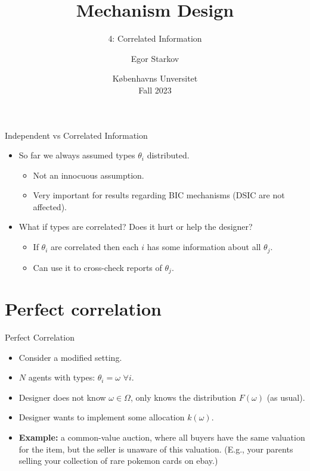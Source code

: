 \documentclass[english,10pt
,aspectratio=169
]{beamer}
\title{Mechanism Design}
\subtitle{4: Correlated Information}
\author{Egor Starkov}
\date{K{\o}benhavns Unversitet \\
	Fall 2023}
\begin{document}
	\frame[plain]{\titlepage}



\begin{frame}{Independent vs Correlated Information}
\begin{itemize}
	\item So far we always assumed types $\theta_i$  distributed.
	\begin{itemize}
		\item Not an innocuous assumption.
		\item Very important for results regarding BIC mechanisms (DSIC are not affected).
	\end{itemize}
	\item What if types are \alert{correlated}? Does it hurt or help the designer?
	\begin{itemize}
		\item If $\theta_i$ are correlated then each $i$ has some information about all $\theta_j$.
		\item Can use it to cross-check reports of $\theta_j$.
	\end{itemize}
\end{itemize}
\end{frame}


\section{Perfect correlation}

\begin{frame}{Perfect Correlation}
\begin{itemize}
	\item Consider a modified  setting.
	\item $N$ agents with  types: $\theta_i = \omega$ $\forall i$.
	\item Designer does not know $\omega \in \Omega$, only knows the distribution $F(\omega)$ (as usual).
	\item Designer wants to implement some allocation $k(\omega)$.
	\item \textbf{Example:} a common-value auction, where all buyers have the same valuation for the item, but the seller is unaware of this valuation. (E.g., your parents selling your collection of rare pokemon cards on ebay.)
\end{itemize}
\end{frame}
\end{document}
